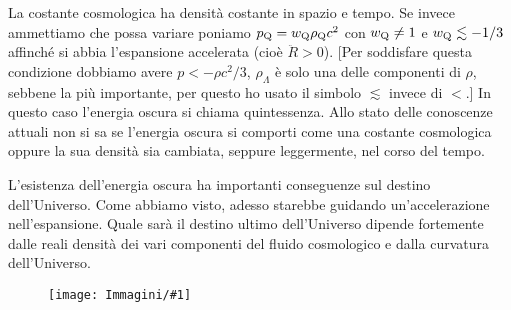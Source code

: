 \documentclass[12pt,a4paper,fleqn,draft]{article}
\newcommand{\figura}[1]{
  \begin{figure}[h!]
    \texttt{[image: Immagini/\#1]}
  \end{figure}
}
\begin{document}
La costante cosmologica ha densità costante in spazio e tempo. Se invece
ammettiamo che possa variare poniamo
$p_{\textup{Q}} = w_{\textup{Q}}\rho_{\textup{Q}}c^2$ con
$w_{\textup{Q}} \neq 1$ e $w_{\textup{Q}} \lesssim -1/3$ affinché si abbia
l'espansione accelerata (cioè $\ddot{R}>0$). [Per soddisfare questa condizione
dobbiamo avere $p < -\rho c^2/3$, $\rho_\Lambda$ è solo una delle componenti di
$\rho$, sebbene la più importante, per questo ho usato il simbolo $\lesssim$
invece di $<$.] In questo caso l'energia oscura si chiama quintessenza. Allo
stato delle conoscenze attuali non si sa se l'energia oscura si comporti come
una costante cosmologica oppure la sua densità sia cambiata, seppure
leggermente, nel corso del tempo.

L'esistenza dell'energia oscura ha importanti conseguenze sul destino
dell'Universo. Come abbiamo visto, adesso starebbe guidando un'accelerazione
nell'espansione. Quale sarà il destino ultimo dell'Universo dipende fortemente
dalle reali densità dei vari componenti del fluido cosmologico e dalla curvatura
dell'Universo.
\figura{500px-Friedmann_universes}
\end{document}
